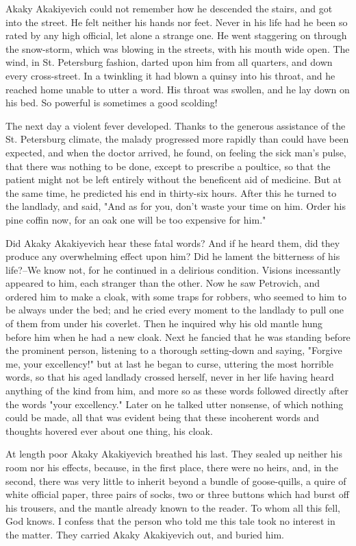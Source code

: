 Akaky Akakiyevich could not remember how he descended the stairs, and
got into the street. He felt neither his hands nor feet. Never in his
life had he been so rated by any high official, let alone a strange
one. He went staggering on through the snow-storm, which was blowing
in the streets, with his mouth wide open. The wind, in St. Petersburg
fashion, darted upon him from all quarters, and down every
cross-street. In a twinkling it had blown a quinsy into his throat,
and he reached home unable to utter a word. His throat was swollen,
and he lay down on his bed. So powerful is sometimes a good scolding!

The next day a violent fever developed. Thanks to the generous
assistance of the St. Petersburg climate, the malady progressed more
rapidly than could have been expected, and when the doctor arrived, he
found, on feeling the sick man's pulse, that there was nothing to be
done, except to prescribe a poultice, so that the patient might not be
left entirely without the beneficent aid of medicine. But at the same
time, he predicted his end in thirty-six hours. After this he turned
to the landlady, and said, "And as for you, don't waste your time on
him. Order his pine coffin now, for an oak one will be too expensive
for him."

Did Akaky Akakiyevich hear these fatal words? And if he heard them,
did they produce any overwhelming effect upon him? Did he lament the
bitterness of his life?--We know not, for he continued in a delirious
condition. Visions incessantly appeared to him, each stranger than the
other. Now he saw Petrovich, and ordered him to make a cloak, with
some traps for robbers, who seemed to him to be always under the bed;
and he cried every moment to the landlady to pull one of them from
under his coverlet. Then he inquired why his old mantle hung before
him when he had a new cloak. Next he fancied that he was standing
before the prominent person, listening to a thorough setting-down and
saying, "Forgive me, your excellency!" but at last he began to curse,
uttering the most horrible words, so that his aged landlady crossed
herself, never in her life having heard anything of the kind from him,
and more so as these words followed directly after the words "your
excellency." Later on he talked utter nonsense, of which nothing could
be made, all that was evident being that these incoherent words and
thoughts hovered ever about one thing, his cloak.

At length poor Akaky Akakiyevich breathed his last. They sealed up
neither his room nor his effects, because, in the first place, there
were no heirs, and, in the second, there was very little to inherit
beyond a bundle of goose-quills, a quire of white official paper,
three pairs of socks, two or three buttons which had burst off his
trousers, and the mantle already known to the reader. To whom all this
fell, God knows. I confess that the person who told me this tale took
no interest in the matter. They carried Akaky Akakiyevich out, and
buried him.

